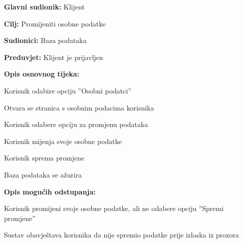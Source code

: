                         \noindent {}
					\begin{packed_item}
	
						\item \textbf{Glavni sudionik: }Klijent
						\item  \textbf{Cilj:} Promijeniti osobne podatke
						\item  \textbf{Sudionici:} Baza podataka
						\item  \textbf{Preduvjet:} Klijent je prijavljen
						\item  \textbf{Opis osnovnog tijeka:}
						
						\item[] \begin{packed_enum}

							\item Korisnik odabire opciju ”Osobni podatci”
							\item Otvara se stranica s osobnim podacima korisnika
							\item Korisnik odabere opciju za promjenu podataka
							\item Korisnik mijenja svoje osobne podatke
							\item Korisnik sprema promjene
                                \item Baza podataka se ažurira
							
						\end{packed_enum}

                            \item  \textbf{Opis mogućih odstupanja:}
						
						\item[] \begin{packed_item}
	
							\item[2.a] Korisnik promijeni svoje osobne podatke, ali ne odabere opciju ”Spremi promjene”

							\item[] \begin{packed_enum}
								
								\item Sustav obavještava korisnika da nije spremio podatke prije izlaska iz prozora
								
								
							\end{packed_enum}
	
							
						\end{packed_item}	
					\end{packed_item}

